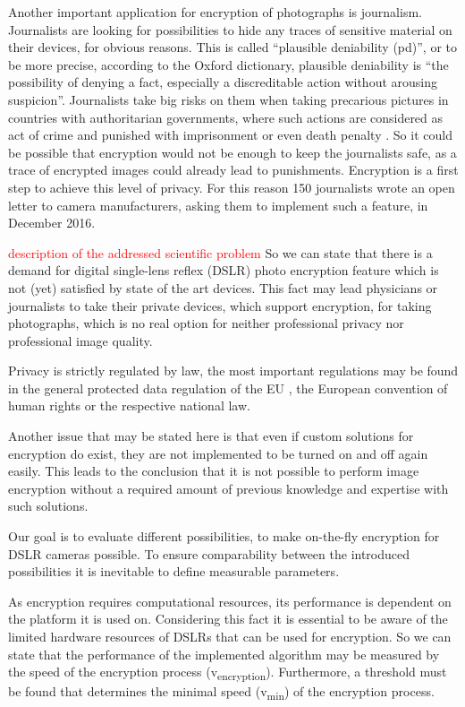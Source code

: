 \documentclass[12pt,a4paper,titlepage,oneside]{scrartcl}
\newcommand\todo[1]{\textcolor{red}{#1}}
\begin{document}
Another important application for encryption of photographs is journalism.
Journalists are looking for possibilities to hide any traces of sensitive material on their devices, for obvious reasons.
This is called ``plausible deniability (pd)'', or to be more precise, according to the Oxford dictionary, plausible deniability is ``the possibility of denying a fact, especially a discreditable action without arousing suspicion''.\cite{OxforddictPlausibleDen}
Journalists take big risks on them when taking precarious pictures in countries with authoritarian governments, where such actions are considered as act of crime and punished with imprisonment or even death penalty \cite{Amnesty2016}.
So it could be possible that encryption would not be enough to keep the journalists safe, as a trace of encrypted images could already lead to punishments.
Encryption is a first step to achieve this level of privacy.
For this reason 150 journalists wrote an open letter to camera manufacturers, asking them to implement such a feature, in December 2016.\cite{fp2016}

\todo{description of the addressed scientific problem}
So we can state that there is a demand for digital single-lens reflex (DSLR) photo encryption feature which is not (yet) satisfied by state of the art devices.
This fact may lead physicians or journalists to take their private devices, which support encryption, for taking photographs, which is no real option for neither professional privacy nor professional image quality.

Privacy is strictly regulated by law, the most important regulations may be found in the general protected data regulation of the EU \cite{EuropeanParliament2016}, the European convention of human rights \cite{EuropeanCourtofHumanRights2010} or the respective national law. \cite{EHG2015, DSG2000, ELGA2012}

Another issue that may  be stated here is that even if custom solutions for encryption do exist, they are not implemented to be turned on and off again easily.
This leads to the conclusion that it is not possible to perform image encryption without a required amount of previous knowledge and expertise with such solutions.

Our goal is to evaluate different possibilities, to make on-the-fly encryption for DSLR cameras possible.
To ensure comparability between the introduced possibilities it is inevitable to define measurable parameters.

As encryption requires computational resources, its performance is dependent on the platform it is used on.
Considering this fact it is essential to be aware of the limited hardware resources of DSLRs that can be used for encryption.
So we can state that the performance of the implemented algorithm may be measured by the speed of the encryption process (v\textsubscript{encryption}).
Furthermore, a threshold must be found that determines the minimal speed (v\textsubscript{min}) of the encryption process.
\end{document}
